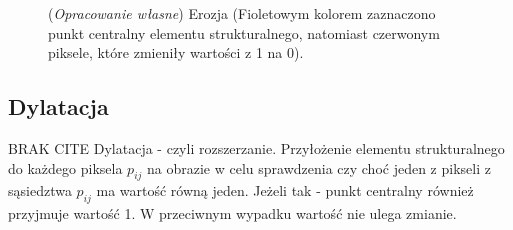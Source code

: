 \documentclass{article}
\begin{document}
        \begin{figure}[H]
            \centering
            \qquad
            \qquad
            \caption
            {
                (\textit{Opracowanie własne}) Erozja (Fioletowym kolorem zaznaczono punkt centralny elementu strukturalnego, natomiast czerwonym piksele, które zmieniły wartości z 1 na 0).
            }
            \label{erozja}
        \end{figure}

        \subsection{Dylatacja}
        {
            BRAK CITE
            \label{sec:dylatacja}
            \Large
            \justifying
            \quad
            Dylatacja - czyli rozszerzanie.
            Przyłożenie elementu strukturalnego do każdego piksela \(p_{ij}\) na obrazie w celu sprawdzenia czy choć jeden z pikseli z sąsiedztwa \(p_{ij}\) ma wartość równą jeden.
            Jeżeli tak - punkt centralny również przyjmuje wartość 1. W przeciwnym wypadku wartość nie ulega zmianie.
        }
\end{document}
